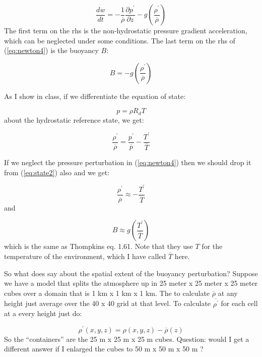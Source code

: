 \documentclass[12pt]{article}
\begin{document}
\begin{equation}
  \label{eq:newton4}
 \frac{dw}{dt} = -\frac{1}{\overline{\rho}} \frac{\partial p^\prime}{\partial z}
- g \left ( \frac{\rho^\prime}{\overline{\rho}} \right )
\end{equation}
The first term on the rhs is the non-hydrostatic pressure gradient acceleration, which can
be neglected under some conditions.  The 
last term on the rhs of (\ref{eq:newton4}) is the buoyancy $B$:

\begin{equation}
  \label{eq:buoyancy}
  B = - g \left ( \frac{\rho^\prime}{\overline{\rho}} \right )
\end{equation}


  As I show in class, if we differentiate the equation of state:

\begin{equation}
  \label{eq:state}
  p=\rho R_d T
\end{equation}
about the hydrostatic reference state, we get:

\begin{equation}
  \label{eq:state2}
  \frac{\rho^\prime}{\overline{\rho}}  = \frac{p^\prime}{\overline{p}}
  - \frac{T^\prime}{\overline{T}}
 \end{equation}


If we neglect the pressure perturbation in (\ref{eq:newton4}) then
we should drop it from  (\ref{eq:state2}) also and 
we get:

\begin{equation}
  \label{eq:state3}
  \frac{\rho^\prime}{\overline{\rho}}  \approx
  - \frac{T^\prime}{\overline{T}}
 \end{equation}
and

\begin{equation}
  \label{eq:buoyancy2}
  B \approx  g \left ( \frac{T^\prime}{\overline{T}} \right )
\end{equation}
which is the same as Thompkins eq. 1.61.  Note that they use $T$ for the
temperature of the environment, which I have called $\overline{T}$ here.

So what does say about the spatial extent of the buoyancy perturbation?  Suppose we
have a model that splits the atmosphere up in 25 meter x 25 meter x 25 meter cubes
over a domain that is 1 km x 1 km x 1 km.  The to calculate $\overline{\rho}$ at
any height just average over the 40 x 40 grid at that level.  To calculate 
$\overline{\rho^\prime}$ for each cell at a every height just do:

\begin{equation}
  \label{eq:rhop}
  \rho^\prime(x,y,z) = \rho(x,y,z) - \overline{\rho}(z)
\end{equation}
So the ``containers'' are the 25 m x 25 m x 25 m cubes.  Question:  would I get a different answer
if I enlarged the cubes to 50 m x 50 m x 50 m ?
\end{document}
